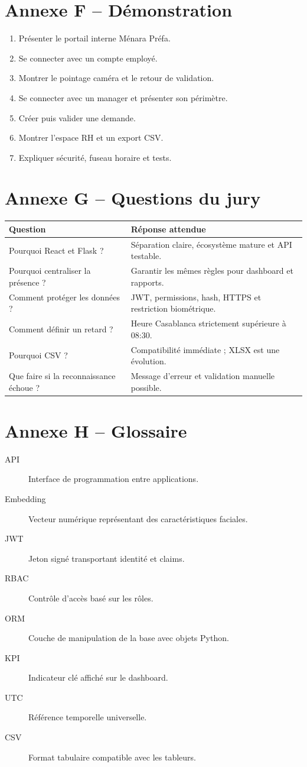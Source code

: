 \documentclass[11pt,a4paper,oneside]{report}
\begin{document}
\chapter{Annexe F -- Démonstration}
\begin{enumerate}
\item Présenter le portail interne Ménara Préfa.
\item Se connecter avec un compte employé.
\item Montrer le pointage caméra et le retour de validation.
\item Se connecter avec un manager et présenter son périmètre.
\item Créer puis valider une demande.
\item Montrer l'espace RH et un export CSV.
\item Expliquer sécurité, fuseau horaire et tests.
\end{enumerate}
\chapter{Annexe G -- Questions du jury}
\begin{longtable}{p{6cm}p{7cm}}\toprule
Question & Réponse attendue\\\midrule
Pourquoi React et Flask ? & Séparation claire, écosystème mature et API testable.\\
Pourquoi centraliser la présence ? & Garantir les mêmes règles pour dashboard et rapports.\\
Comment protéger les données ? & JWT, permissions, hash, HTTPS et restriction biométrique.\\
Comment définir un retard ? & Heure Casablanca strictement supérieure à 08:30.\\
Pourquoi CSV ? & Compatibilité immédiate ; XLSX est une évolution.\\
Que faire si la reconnaissance échoue ? & Message d'erreur et validation manuelle possible.\\\bottomrule
\end{longtable}
\chapter{Annexe H -- Glossaire}
\begin{description}
\item[API] Interface de programmation entre applications.
\item[Embedding] Vecteur numérique représentant des caractéristiques faciales.
\item[JWT] Jeton signé transportant identité et claims.
\item[RBAC] Contrôle d'accès basé sur les rôles.
\item[ORM] Couche de manipulation de la base avec objets Python.
\item[KPI] Indicateur clé affiché sur le dashboard.
\item[UTC] Référence temporelle universelle.
\item[CSV] Format tabulaire compatible avec les tableurs.
\end{description}
\end{document}
